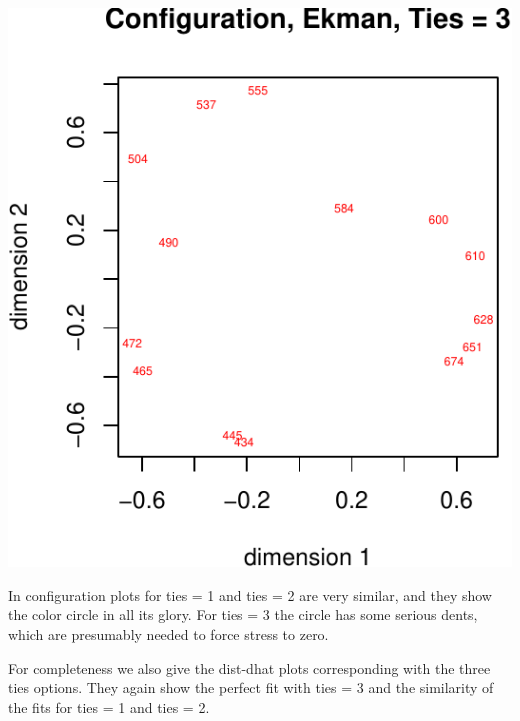 \documentclass[
  12pt,
]{article}
\begin{document}
\begin{center}\includegraphics{smacofRO_files/figure-latex/plotekmanconfs-3} \end{center}

In configuration plots for ties = 1 and ties = 2 are very similar, and they show
the color circle in all its glory. For ties = 3 the circle has some serious dents,
which are presumably needed to force stress to zero.

For completeness we also give the dist-dhat plots corresponding with the
three ties options. They again show the perfect fit with ties = 3 and the
similarity of the fits for ties = 1 and ties = 2.
\end{document}
